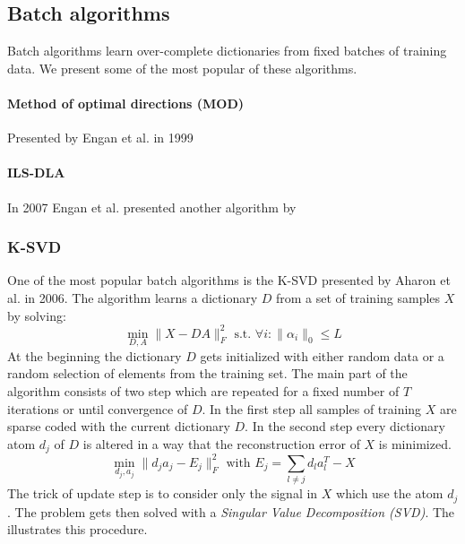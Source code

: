 \subsection{Batch algorithms}
Batch algorithms learn over-complete dictionaries from fixed batches of
training data. We present some of the most popular of these algorithms.

\paragraph{Method of optimal directions (MOD)}
Presented by Engan et al. in 1999\cite{Engan1999a} 

\paragraph{ILS-DLA}
In 2007 Engan et al.\cite{Engan2007} presented another algorithm by   


\subsubsection{K-SVD}
\label{sec:k-svd}
One of the most popular batch algorithms is the K-SVD presented by
Aharon et al. in 2006\cite{Aharon2006}. The algorithm learns a dictionary $D$
from a set of training samples $X$ by solving:
\begin{equation*}
\min_{D,A} \lVert X - DA \rVert^{2}_{F} \textrm{ s.t. }
\forall i : \lVert \alpha_i \rVert_{0} \leq L
\end{equation*}
At the beginning the dictionary $D$ gets initialized with either random data or
a random selection of elements from the training set. The main part of the
algorithm consists of two step which are repeated for a fixed number of $T$
iterations or until convergence of $D$. In the first step all samples of
training $X$ are sparse coded with the current dictionary $D$. In the second
step every dictionary atom $d_j$ of $D$ is altered in a way that the
reconstruction error of $X$ is minimized. 
\begin{equation*}
\min_{d_j,a_j} \lVert d_ja_j - E_j \rVert^{2}_{F} \textrm{ with }
E_j = \sum_{l\neq j} d_la_l^T - X
\end{equation*} 
The trick of update step is to consider only the signal in $X$ which use the
atom $d_j$. The problem gets then solved with a \emph{Singular Value
Decomposition (SVD)}. 
The  illustrates this procedure. 

